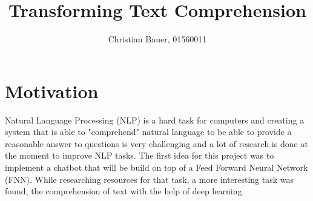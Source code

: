 \usepackage{wrapfig}

\title{Transforming Text Comprehension}
\author{Christian Bauer, 01560011}
\date{}

% 
% 




\maketitle



\tableofcontents
    
\pagebreak

    \section{Motivation}
    \label{sec:motivation}


        Natural Language Processing (NLP) is a hard task for computers and creating a system that is able to "comprehend" natural language to be able to provide a reasonable answer to questions is very challenging and a lot of research is done at the moment to improve NLP tasks.
        The first idea for this project was to implement a chatbot that will be build on top of a Feed Forward Neural Network (FNN).
        While researching resources for that task, a more interesting task was found, the comprehension of text with the help of deep learning.

